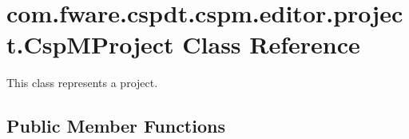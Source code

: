 \hypertarget{classcom_1_1fware_1_1cspdt_1_1cspm_1_1editor_1_1project_1_1_csp_m_project}{}\section{com.\+fware.\+cspdt.\+cspm.\+editor.\+project.\+Csp\+M\+Project Class Reference}
\label{classcom_1_1fware_1_1cspdt_1_1cspm_1_1editor_1_1project_1_1_csp_m_project}


This class represents a project.  


\subsection*{Public Member Functions}
